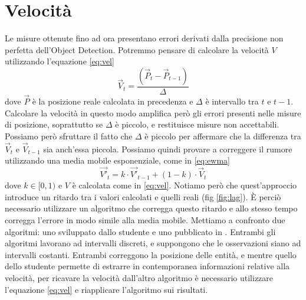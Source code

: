\chapter{Velocità}
\label{sec:velocita}

Le misure ottenute fino ad ora presentano errori derivati dalla precisione non perfetta dell'Object Detection.
Potremmo pensare di  calcolare la velocità $V$ utilizzando l'equazione \ref{eq:vel}
\begin{equation}
    \label{eq:vel}
    \vec{V}_t = \frac{(\vec{P}_t - \vec{P}_{t-1})}{\Delta}
\end{equation}
dove $\vec{P}$ è la posizione reale calcolata in precedenza e $\Delta$ è intervallo tra $t$ e $t-1$.
Calcolare la velocità in questo modo amplifica però gli errori presenti nelle misure di posizione, soprattutto se $\Delta$ è piccolo, e restituisce misure non accettabili.
Possiamo però sfruttare il fatto che $\Delta$ è piccolo per affermare che la differenza tra $\vec{V}_t$ e $\vec{V}_{t-1}$ sia anch'essa piccola.
Possiamo quindi provare a correggere il rumore utilizzando una media mobile esponenziale, come in \ref{eq:ewma}
\begin{equation}
    \label{eq:ewma}
    \vec{V'}_t = k \cdot \vec{V'}_{t-1} + (1-k) \cdot \vec{V}_t
\end{equation}
dove $k \in [0, 1)$ e $V$ è calcolata come in \ref{eq:vel}.
Notiamo però che quest'approccio introduce un ritardo tra i valori calcolati e quelli reali (fig \ref{fig:lag}).
È perciò necessario utilizzare un algoritmo che corregga questo ritardo e allo stesso tempo corregga l'errore in modo simile alla media mobile.
Mettiamo a confronto due algoritmi: uno sviluppato dallo studente e uno pubblicato in \cite{laviola}.
Entrambi gli algoritmi lavorano ad intervalli discreti, e suppongono che le osservazioni siano ad intervalli costanti.
Entrambi correggono la posizione delle entità, e mentre quello dello studente permette di estrarre in contemporanea informazioni relative alla velocità, per ricavare la velocità dall'altro algoritmo è necessario utilizzare l'equazione \ref{eq:vel} e riapplicare l'algoritmo sui risultati.

